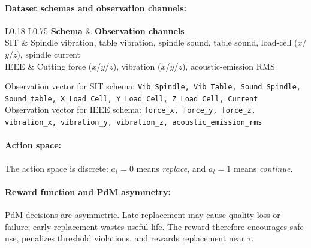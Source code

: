 \documentclass[sn-basic]{sn-jnl}%
\begin{document}
\paragraph{Dataset schemas and observation channels:}
\begin{table}[htbp]
\centering
\caption{Sensor channels used as observations by the RL environment}
\label{tab:schema_features}
	\begin{tabular}{L{0.18\linewidth} L{0.75\linewidth}}
	\toprule
	\textbf{Schema} & \textbf{Observation channels}\\
	\midrule
	SIT & Spindle vibration, table vibration, spindle sound, table sound, load-cell ($x$/$y$/$z$), spindle current\\
	IEEE & Cutting force ($x$/$y$/$z$), vibration ($x$/$y$/$z$), acoustic-emission RMS\\
	\bottomrule
	\end{tabular}
\end{table}

Observation vector for SIT schema: \texttt{Vib\_Spindle, Vib\_Table, Sound\_Spindle, Sound\_table, X\_Load\_Cell, Y\_Load\_Cell, Z\_Load\_Cell, Current}\\

Observation vector for IEEE schema: \texttt{force\_x, force\_y, force\_z, vibration\_x, vibration\_y, vibration\_z, acoustic\_emission\_rms}

\paragraph{Action space:}
The action space is discrete: $a_t=0$ means \emph{replace}, and $a_t=1$ means \emph{continue}.

\paragraph{Reward function and PdM asymmetry:}
PdM decisions are asymmetric. Late replacement may cause quality loss or failure; early replacement wastes useful life. The reward therefore encourages safe use, penalizes threshold violations, and rewards replacement near $\tau$.
\end{document}
